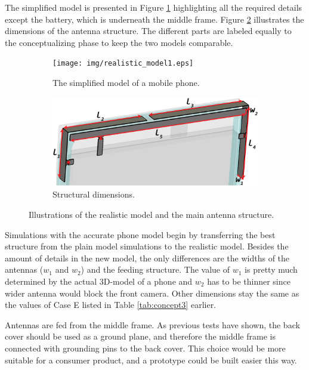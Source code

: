 The simplified model is presented in Figure \ref{fig:realistic_model1} highlighting all the required details except the battery, which is underneath the middle frame. Figure \ref{fig:realistic_model2} illustrates the dimensions of the antenna structure. The different parts are labeled equally to the conceptualizing phase to keep the two models comparable.
\begin{figure}[H]
    \centering
    \begin{subfigure}[b]{0.49\textwidth}
        \texttt{[image: img/realistic\_model1.eps]}
        \caption{The simplified model of a mobile phone.}
        \label{fig:realistic_model1}
    \end{subfigure}
    \begin{subfigure}[b]{0.49\textwidth}
        \includegraphics[width=\textwidth]{img/realistic_model2.eps}
        \caption{Structural dimensions.}
        \label{fig:realistic_model2}
    \end{subfigure}
    \caption{Illustrations of the realistic model and the main antenna structure.}
    \label{fig:realistic_model}
\end{figure}

Simulations with the accurate phone model begin by transferring the best structure from the plain model simulations to the realistic model. Besides the amount of details in the new model, the only differences are the widths of the antennas ($w_1$ and $w_2$) and the feeding structure. The value of $w_1$ is pretty much determined by the actual 3D-model of a phone and $w_2$ has to be thinner since wider antenna would block the front camera. Other dimensions stay the same as the values of Case E listed in Table \ref{tab:concept3} earlier.

Antennas are fed from the middle frame. As previous tests have shown, the back cover should be used as a ground plane, and therefore the middle frame is connected with grounding pins to the back cover. This choice would be more suitable for a consumer product, and a prototype could be built easier this way. 

